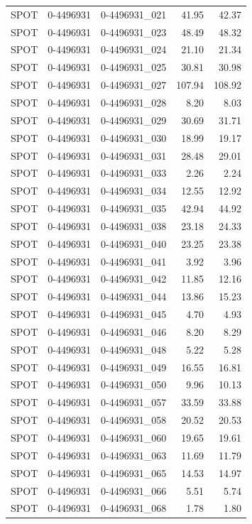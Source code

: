 \begin{tabular}{lllrr}
SPOT & 0-4496931 & 0-4496931_021 & 41.95 & 42.37 \\
SPOT & 0-4496931 & 0-4496931_023 & 48.49 & 48.32 \\
SPOT & 0-4496931 & 0-4496931_024 & 21.10 & 21.34 \\
SPOT & 0-4496931 & 0-4496931_025 & 30.81 & 30.98 \\
SPOT & 0-4496931 & 0-4496931_027 & 107.94 & 108.92 \\
SPOT & 0-4496931 & 0-4496931_028 & 8.20 & 8.03 \\
SPOT & 0-4496931 & 0-4496931_029 & 30.69 & 31.71 \\
SPOT & 0-4496931 & 0-4496931_030 & 18.99 & 19.17 \\
SPOT & 0-4496931 & 0-4496931_031 & 28.48 & 29.01 \\
SPOT & 0-4496931 & 0-4496931_033 & 2.26 & 2.24 \\
SPOT & 0-4496931 & 0-4496931_034 & 12.55 & 12.92 \\
SPOT & 0-4496931 & 0-4496931_035 & 42.94 & 44.92 \\
SPOT & 0-4496931 & 0-4496931_038 & 23.18 & 24.33 \\
SPOT & 0-4496931 & 0-4496931_040 & 23.25 & 23.38 \\
SPOT & 0-4496931 & 0-4496931_041 & 3.92 & 3.96 \\
SPOT & 0-4496931 & 0-4496931_042 & 11.85 & 12.16 \\
SPOT & 0-4496931 & 0-4496931_044 & 13.86 & 15.23 \\
SPOT & 0-4496931 & 0-4496931_045 & 4.70 & 4.93 \\
SPOT & 0-4496931 & 0-4496931_046 & 8.20 & 8.29 \\
SPOT & 0-4496931 & 0-4496931_048 & 5.22 & 5.28 \\
SPOT & 0-4496931 & 0-4496931_049 & 16.55 & 16.81 \\
SPOT & 0-4496931 & 0-4496931_050 & 9.96 & 10.13 \\
SPOT & 0-4496931 & 0-4496931_057 & 33.59 & 33.88 \\
SPOT & 0-4496931 & 0-4496931_058 & 20.52 & 20.53 \\
SPOT & 0-4496931 & 0-4496931_060 & 19.65 & 19.61 \\
SPOT & 0-4496931 & 0-4496931_063 & 11.69 & 11.79 \\
SPOT & 0-4496931 & 0-4496931_065 & 14.53 & 14.97 \\
SPOT & 0-4496931 & 0-4496931_066 & 5.51 & 5.74 \\
SPOT & 0-4496931 & 0-4496931_068 & 1.78 & 1.80 \\

\end{tabular}
